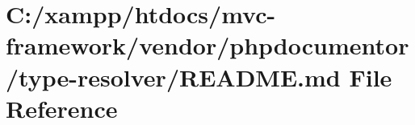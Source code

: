 \hypertarget{vendor_2phpdocumentor_2type-resolver_2_r_e_a_d_m_e_8md}{}\section{C\+:/xampp/htdocs/mvc-\/framework/vendor/phpdocumentor/type-\/resolver/\+R\+E\+A\+D\+ME.md File Reference}
\label{vendor_2phpdocumentor_2type-resolver_2_r_e_a_d_m_e_8md}
